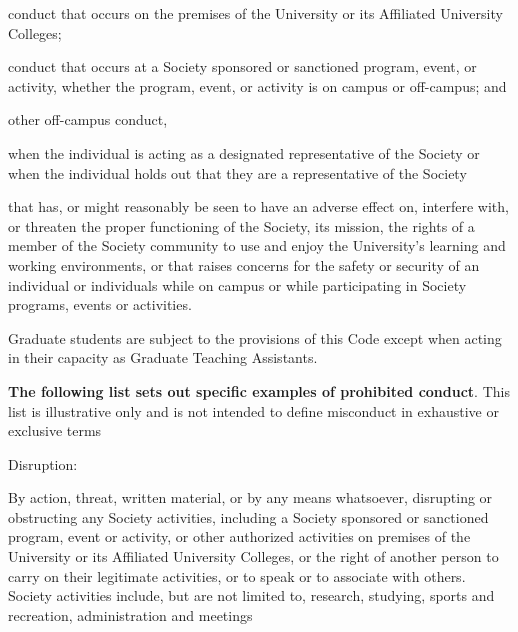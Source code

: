 \begin{longenum}[ label*=\arabic*., align=left]
\begin{longenum}[ label*=\arabic*., align=left]
                \begin{longenum}[ label*=\arabic*., align=left]
                \item conduct  that  occurs  on  the  premises  of  the  University  or  its  Affiliated  University Colleges; 
                \item conduct that occurs at a Society sponsored or sanctioned program, event, or activity, whether the program, event, or activity is on campus or off-campus; and
                \item other off-campus conduct,
                  \begin{longenum}[ label*=\arabic*., align=left]
                       \item when the individual is acting as a designated representative of the Society or when the individual holds out that they are a representative of the Society 
                       \item that has, or might reasonably be seen to have an adverse effect on, interfere with, or threaten the proper functioning of the Society, its mission, the rights of a member of the Society community to use and enjoy the University’s learning and working  environments,  or  that  raises  concerns  for  the  safety  or  security  of  an individual   or   individuals   while   on   campus   or  while   participating   in   Society programs, events or activities.
                  \end{longenum}
                \end{longenum}
\item Graduate  students  are  subject  to  the  provisions  of  this  Code  except  when  acting  in  their capacity as Graduate Teaching Assistants.
     \end{longenum}
\item \textbf{The following list sets out specific examples of prohibited conduct}. This list is illustrative only and is not intended to define misconduct in exhaustive or exclusive terms

 \begin{longenum}[ label*=\arabic*., align=left]
                       \item Disruption:
                       
                       By  action,  threat,  written  material,  or  by  any  means  whatsoever,  disrupting  or  obstructing any Society activities, including a Society sponsored or sanctioned program, event or activity, or other authorized activities on premises of the University or its Affiliated University Colleges, or the right of another person to carry on their legitimate activities, or to speak or to associate with others. Society  activities  include,  but  are  not  limited  to,  research,  studying,  sports  and  recreation, administration and meetings
                

\end{longenum}
\end{longenum}
